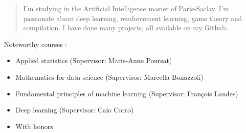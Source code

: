 \documentclass[10pt,a4paper,ragged2e,withhyper]{altacv}
\begin{document}
\begin{paracol}{2}
        
        
        \newpage
        
        \switchcolumn
        
            \begin{quote}
              I'm studying in the Artificial Intelligence master of Paris-Saclay.
              I'm passionate about deep learning, reinforcement learning, game theory
              and compilation.
              I have done many projects, all available on my Github.
            \end{quote}
        
        
            Noteworthy courses :
            \vspace{2pt}
            \begin{itemize}
              \item Applied statistics (Supervisor: Marie-Anne Poursat)
              \item Mathematics for data science (Supervisor: Marcella Bonazzoli)
              \item Fundamental principles of machine learning (Supervisor: François Landes)
              \item Deep learning (Supervisor: Caio Corro)
            \end{itemize}
            \divider

            \begin{itemize}
                \item With honors
            \end{itemize}
            

\end{paracol}
\end{document}
